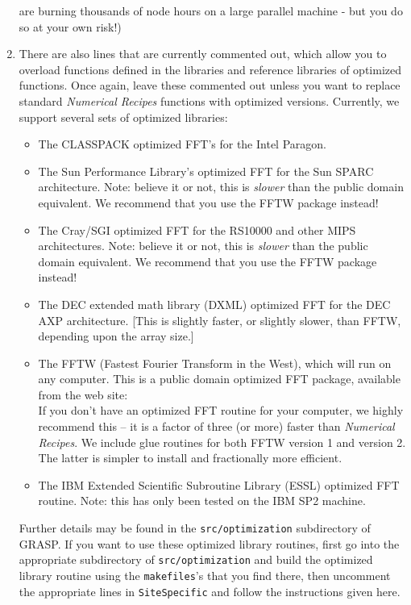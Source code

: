 \begin{enumerate}
are burning thousands of node hours on a large parallel machine - but
you do so at your own risk!)
\item
There are also lines that are currently commented out, which allow you
to overload functions defined in the libraries and reference libraries
of optimized functions.  Once again, leave these commented out unless you
want to replace standard {\it Numerical Recipes} functions with optimized
versions.  Currently, we support several sets of optimized libraries:
\begin{itemize}
\item
The CLASSPACK optimized FFT's for the Intel Paragon.
\item
The Sun Performance Library's optimized FFT for the Sun SPARC
architecture.  Note: believe it or not, this is {\it slower} than the
public domain equivalent.  We recommend that you use the FFTW package
instead!
\item
The Cray/SGI optimized FFT for the RS10000 and other MIPS architectures.
Note: believe it or not, this is {\it slower} than the
public domain equivalent.  We recommend that you use the FFTW package
instead!
\item
The DEC extended math library (DXML) optimized FFT for the DEC AXP
architecture.  [This is slightly faster, or slightly slower, than FFTW,
depending upon the array size.]
\item
The FFTW (Fastest Fourier Transform in the West), which will run on
any computer.  This is a public domain optimized FFT package, available
from the web site:\\
If you don't have an optimized FFT routine for your computer, we highly
recommend this -- it is a factor of three (or more) faster than {\it
Numerical Recipes}. We include glue routines for both FFTW version 1 and
version 2.  The latter is simpler to install and fractionally more efficient.
\item
The IBM Extended Scientific Subroutine Library (ESSL) optimized FFT routine. 
Note: this has only been tested on the IBM SP2 machine. 
\end{itemize}
Further details may be found in the {\tt src/optimization} subdirectory
of GRASP.  If you want to use these optimized library routines, first
go into the appropriate subdirectory of {\tt src/optimization} and build
the optimized library routine using the {\tt makefiles}'s that you find
there, then uncomment the appropriate lines in {\tt SiteSpecific} and
follow the instructions given here.

\end{enumerate}
